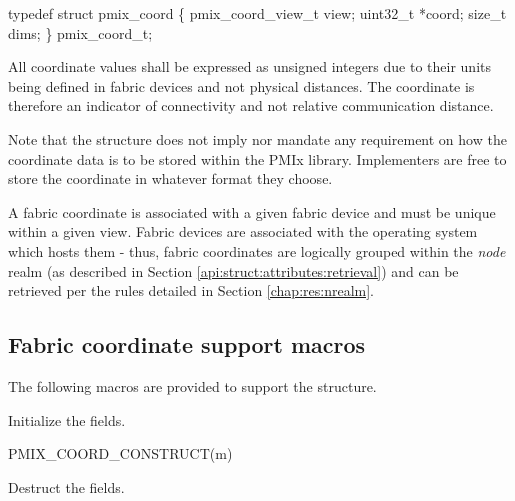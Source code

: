 \cspecificstart
\begin{codepar}
typedef struct pmix_coord \{
    pmix_coord_view_t view;
    uint32_t *coord;
    size_t dims;
\} pmix_coord_t;
\end{codepar}
\cspecificend

All coordinate values shall be expressed as unsigned integers due to their units being defined in fabric devices and not physical distances. The coordinate is therefore an indicator of connectivity and not relative communication distance.

\adviceimplstart
Note that the  structure does not imply nor mandate any requirement on how the coordinate data is to be stored within the \ac{PMIx} library. Implementers are free to store the coordinate in whatever format they choose.
\adviceimplend

A fabric coordinate is associated with a given fabric device and must be unique within a given view. Fabric devices are associated with the operating system which hosts them - thus, fabric coordinates are logically grouped within the \emph{node} realm (as described in Section \ref{api:struct:attributes:retrieval}) and can be retrieved per the rules detailed in Section \ref{chap:res:nrealm}.

\subsection{Fabric coordinate support macros}
\label{api:netcoord:macros}

The following macros are provided to support the  structure.


Initialize the  fields.

\cspecificstart
\begin{codepar}
PMIX_COORD_CONSTRUCT(m)
\end{codepar}
\cspecificend

\begin{arglist}
\end{arglist}


Destruct the  fields.

